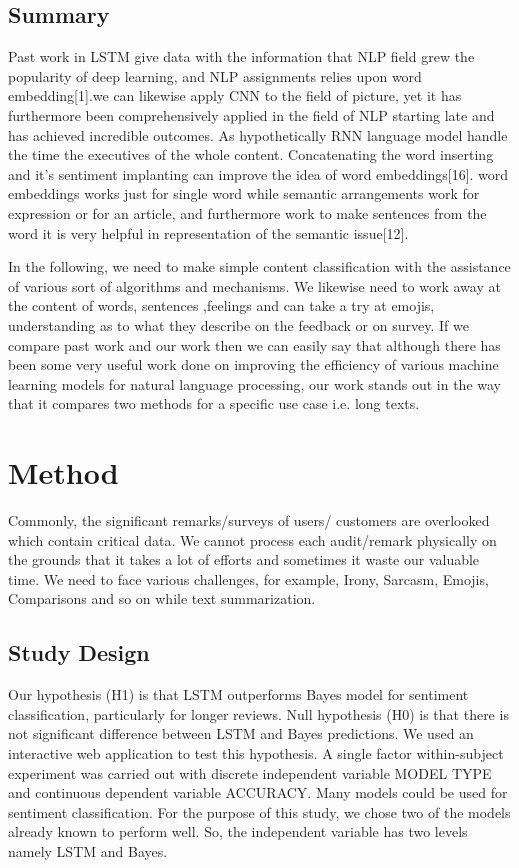 \documentclass[sigplan,screen]{acmart}
\begin{document}
\subsection{Summary}
Past work in LSTM give data with the information that NLP field grew the popularity of deep learning, and NLP assignments relies upon word embedding[1].we can likewise apply CNN to the field of picture, yet it has furthermore been comprehensively applied in the field of NLP starting late and has achieved incredible outcomes. As hypothetically RNN language model handle the time the executives of the whole content. Concatenating the word inserting and it's sentiment implanting can improve the idea of word embeddings[16]. word embeddings works just for single word while semantic arrangements work for expression or for an article, and furthermore work to make sentences from the word it is very helpful in representation of the semantic issue[12].


In the following, we need to make simple content classification with the assistance of various sort of algorithms and mechanisms. We likewise need to work away at the content of words, sentences ,feelings and can take a try at emojis, understanding as to what they describe on the feedback or on survey. If we compare past work and our work then we can easily say that although there has been some very useful work done on improving the efficiency of various machine learning models for natural language processing, our work stands out in the way that it compares two methods for a specific use case i.e. long texts.


\section{Method}
Commonly, the significant remarks/surveys of users/ customers are overlooked which contain critical data. We cannot process each audit/remark physically on the grounds that it takes a lot of efforts and sometimes it waste our valuable time. We need to face various challenges, for example, Irony, Sarcasm, Emojis, Comparisons and so on while text summarization.


\subsection{Study Design}
Our hypothesis (H1) is that LSTM outperforms Bayes model for sentiment classification, particularly for longer reviews. Null hypothesis (H0) is that there is not significant difference between LSTM and Bayes predictions. We used an interactive web application to test this hypothesis. A single factor within-subject experiment was carried out with discrete independent variable MODEL TYPE and continuous dependent variable ACCURACY. Many models could be used for sentiment classification. For the purpose of this study, we chose two of the models already known to perform well. So, the independent variable has two levels namely LSTM and Bayes.
\end{document}
